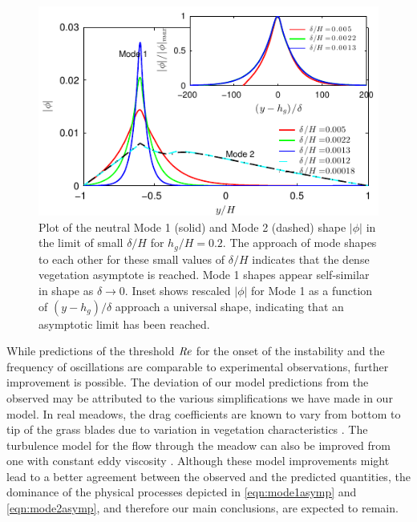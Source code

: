 \documentclass{jfm}
\newcommand{\hg}{h_g}
\newcommand{\Ndg}{\tilde{N}_g}
\begin{document}
\begin{figure}
\centerline{\includegraphics[]{Asymptotic_noshear}}
\caption{
Plot of the neutral Mode 1 (solid) and Mode 2 (dashed) shape $|\phi|$ in the limit of small $\delta/H$ for $\hg/H=0.2$. 
The approach of mode shapes to each other for these small values of $\delta/H$ indicates that the dense vegetation asymptote is reached. 
Mode 1 shapes appear self-similar in shape as $\delta\to 0$.
Inset shows rescaled $|\phi|$ for Mode 1 as a function of $(y-\hg)/\delta$ approach a universal shape, indicating that an asymptotic limit has been reached. 
}
\label{Asymptotic_mode}
\end{figure}
While predictions of the threshold $\mbox{\textit{Re}}$ for the onset of the instability and the frequency of oscillations are comparable to experimental observations, further improvement is possible.
The deviation of our model predictions from the observed may be attributed to the various simplifications we have made in our model. 
In real meadows, the drag coefficients are known to vary from bottom to tip of the grass blades due to variation in vegetation characteristics \citep{Vivoni98,Nepf00}. 
The turbulence model for the flow through the meadow can also be improved from one with constant eddy viscosity \citep{Ghisal02, Nepf04}. 
Although these model improvements might lead to a better agreement between the observed and the predicted quantities, the dominance of the physical processes depicted in \eqref{eqn:mode1asymp} and \eqref{eqn:mode2asymp}, and therefore our main conclusions, are expected to remain.
\end{document}
